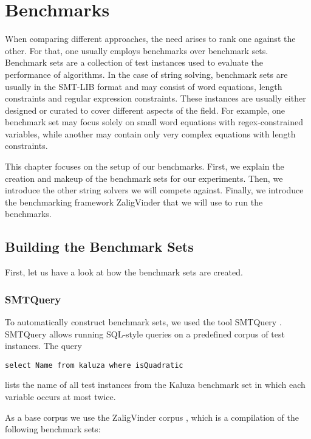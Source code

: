 \chapter{Benchmarks} \label{ch_benchmarks}
When comparing different approaches, the need arises to rank one against the other. For that, one usually employs benchmarks over benchmark sets. Benchmark sets are a collection of test instances used to evaluate the performance of algorithms. In the case of string solving, benchmark sets are usually in the SMT-LIB format and may consist of word equations, length constraints and regular expression constraints. These instances are usually either designed or curated to cover different aspects of the field. For example, one benchmark set may focus solely on small word equations with regex-constrained variables, while another may contain only very complex equations with length constraints.

This chapter focuses on the setup of our benchmarks. First, we explain the creation and makeup of the benchmark sets for our experiments. Then, we introduce the other string solvers we will compete against. Finally, we introduce the benchmarking framework ZaligVinder \cite{zaligvinder} that we will use to run the benchmarks.

\section{Building the Benchmark Sets}

First, let us have a look at how the benchmark sets are created.

\subsection{SMTQuery}
To automatically construct benchmark sets, we used the tool SMTQuery \cite{smtquery}.
SMTQuery allows running SQL-style queries on a predefined corpus of test instances.
The query
\begin{verbatim}
select Name from kaluza where isQuadratic
\end{verbatim}
lists the name of all test instances from the Kaluza \cite{benchmarkset-kaluza} benchmark set in which each variable occurs at most twice.

As a base corpus we use the ZaligVinder corpus \cite{zaligvinder}, which is a compilation of the following benchmark sets:

